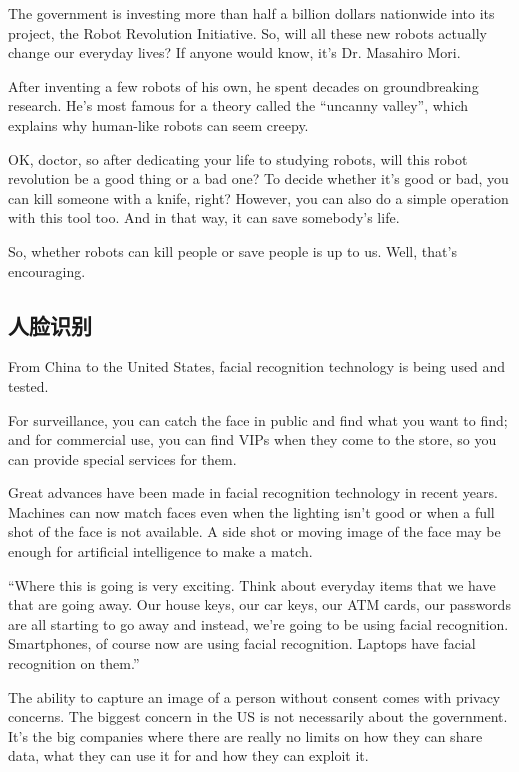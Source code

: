 The government is investing more than half a billion dollars nationwide into its project, the Robot Revolution Initiative. So, will all these new robots actually change our everyday lives? If anyone would know, it's Dr. Masahiro Mori.

After inventing a few robots of his own, he spent decades on groundbreaking research. He's most famous for a theory called the “uncanny valley”, which explains why human-like robots can seem creepy.

OK, doctor, so after dedicating your life to studying robots, will this robot revolution be a good thing or a bad one?
To decide whether it's good or bad, you can kill someone with a knife, right? However, you can also do a simple operation with this tool too. And in that way, it can save somebody's life.

So, whether robots can kill people or save people is up to us. Well, that's encouraging.
\subsection{人脸识别}
\begin{margintable}\vspace{-2cm}\footnotesize
\end{margintable}
From China to the United States, facial recognition technology is being used and tested.

For surveillance, you can catch the face in public and find what you want to find; and for commercial use, you can find VIPs when they come to the store, so you can provide special services for them.

Great advances have been made in facial recognition technology in recent years.
Machines can now match faces even when the lighting isn't good or when a full shot of the face is not available. A side shot or moving image of the face may be enough for artificial intelligence to make a match.

“Where this is going is very exciting. Think about everyday items that we have that are going away. Our house keys, our car keys, our ATM cards, our passwords are all starting to go away and instead, we're going to be using facial recognition. Smartphones, of course now are using facial recognition. Laptops have facial recognition on them.”

The ability to capture an image of a person without consent comes with privacy concerns.
The biggest concern in the US is not necessarily about the government. It's the big companies where there are really no limits on how they can share data, what they can use it for and how they can exploit it.

